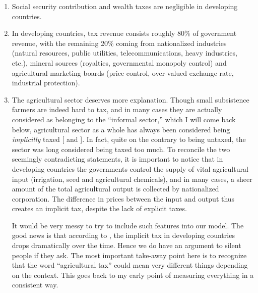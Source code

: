 \documentclass[twoside,11pt,leqno]{article}
\begin{document}
\begin{enumerate}
    \item
    Social security contribution and wealth taxes are negligible in developing countries.
    \item
    In developing countries, tax revenue consists roughly 80\% of government revenue, with the remaining 20\% coming from nationalized industries (natural resources, public utilities, telecommunications, heavy industries, etc.), mineral sources (royalties, governmental monopoly control) and agricultural marketing boards (price control, over-valued exchange rate, industrial protection).
    \item
    The agricultural sector deserves more explanation. Though small subsistence farmers are indeed hard to tax, and in many cases they are actually considered as belonging to the ``informal sector,'' which I will come back below, agricultural sector as a whole has always been considered being \textit{implicitly} taxed [\citet{BinswangerDeininger:1997} and \citet{Andersonetal:2013}]. In fact, quite on the contrary to being untaxed, the sector was long considered being taxed too much. To reconcile the two seemingly contradicting statements, it is important to notice that in developing countries the governments control the supply of vital agricultural input (irrigation, seed and agricultural chemicals), and in many cases, a sheer amount of the total agricultural output is collected by nationalized corporation. The difference in prices between the input and output thus creates an implicit tax, despite the lack of explicit taxes.

    It would be very messy to try to include such features into our model. The good news is that according to \citet{Andersonetal:2013}, the implicit tax in developing countries drops dramatically over the time. Hence we do have an argument to silent people if they ask. The most important take-away point here is to recognize that the word ``agricultural tax'' could mean very different things depending on the context. This goes back to my early point of measuring everything in a consistent way.
\end{enumerate}
\end{document}
